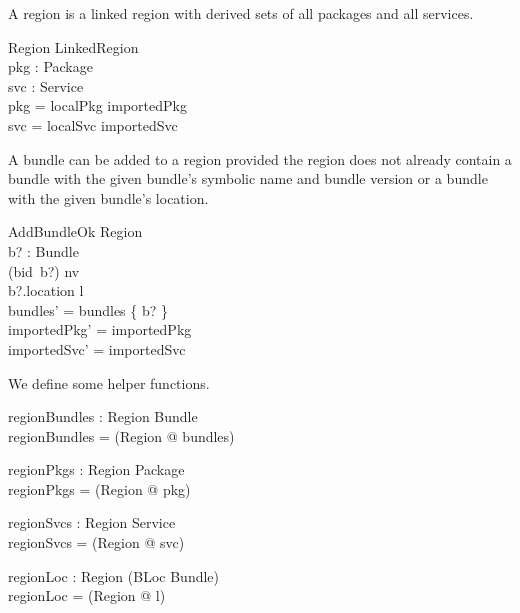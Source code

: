\documentclass[a4paper,9pt]{article}
\begin{document}
A region is a linked region with derived sets of all packages and all services.
\begin{schema}{Region}
  LinkedRegion \\
  pkg : \power Package \\
  svc : \power Service \\
\where
  pkg = localPkg \cup importedPkg \\
  svc = localSvc \cup importedSvc \\
\end{schema}

A bundle can be added to a region provided the region does not already contain a bundle with
the given bundle's symbolic name and bundle version or a bundle with the given bundle's location.
\begin{schema}{AddBundleOk}
  \Delta Region \\
  b? : Bundle \\
\where
  (bid~b?) \notin \dom nv \\
  b?.location \notin \dom l \\
  bundles' = bundles \cup \{ b? \} \\
  importedPkg' = importedPkg \\
  importedSvc' = importedSvc \\
\end{schema}

We define some helper functions.
\begin{axdef}
  regionBundles : Region \fun \power Bundle \\
\where
 regionBundles = (\lambda Region @ bundles) \\
\end{axdef}
\begin{axdef}
  regionPkgs : Region \fun \power Package \\
\where
 regionPkgs = (\lambda Region @ pkg) \\
\end{axdef}
\begin{axdef}
  regionSvcs : Region \fun \power Service \\
\where
 regionSvcs = (\lambda Region @ svc) \\
\end{axdef}
\begin{axdef}
  regionLoc : Region \fun (BLoc \pinj Bundle) \\
\where
 regionLoc = (\lambda Region @ l) \\
\end{axdef}
\end{document}
